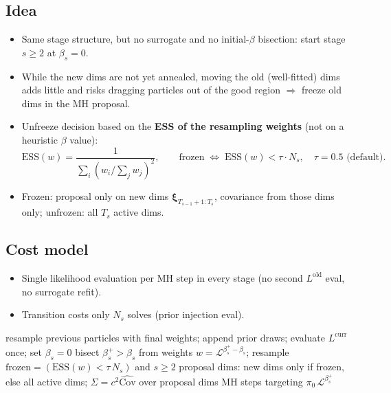 \documentclass[11pt,a4paper]{article}
\newcommand{\bxi}{\boldsymbol{\xi}}          %
\newcommand{\bL}{\mathcal{L}}                 %
\newcommand{\bpi}{\pi}                        %
\newcommand{\ESS}{\mathrm{ESS}}
\newcommand{\Ntot}{N}
\begin{document}
\subsection{Idea}
\begin{itemize}
  \item Same stage structure, but no surrogate and no initial-$\beta$ bisection: start stage $s \ge 2$ at $\beta_s = 0$.
  \item While the new dims are not yet annealed, moving the old (well-fitted) dims adds little and risks dragging particles out of the good region $\Rightarrow$ freeze old dims in the MH proposal.
  \item Unfreeze decision based on the \textbf{ESS of the resampling weights} (not on a heuristic $\beta$ value):
    \begin{equation}
      \ESS(w) = \frac{1}{\sum_i (w_i/\sum_j w_j)^2},\qquad
      \text{frozen} \;\Leftrightarrow\; \ESS(w) < \tau \cdot \Ntot_s,\quad \tau = 0.5 \text{ (default)}.
    \end{equation}
  \item Frozen: proposal only on new dims $\bxi_{T_{s-1}+1:T_s}$, covariance from those dims only; unfrozen: all $T_s$ active dims.
\end{itemize}

\subsection{Cost model}
\begin{itemize}
  \item Single likelihood evaluation per MH step in every stage (no second $L^{\mathrm{old}}$ eval, no surrogate refit).
  \item Transition costs only $\Ntot_s$ solves (prior injection eval).
\end{itemize}

\begin{algorithm}[ht]
\caption{SequentialTMCMC with \texttt{FreezeUnfreezeTransition} (inner loop of stage $s \ge 2$)}
\begin{algorithmic}[1]
\State resample previous particles with final weights; append prior draws; evaluate $L^{\mathrm{curr}}$ once; set $\beta_s = 0$
  \State bisect $\beta_s^{+} > \beta_s$ from weights $w = \bL^{\beta_s^{+}-\beta_s}$; resample
  \State $\mathrm{frozen} = (\ESS(w) < \tau\,\Ntot_s)$ and $s \ge 2$
  \State proposal dims: new dims only if frozen, else all active dims; $\Sigma = c^2\widehat{\mathrm{Cov}}$ over proposal dims
  \State MH steps targeting $\bpi_0\,\bL^{\beta_s^{+}}$
\EndWhile
\end{algorithmic}
\end{algorithm}
\end{document}
